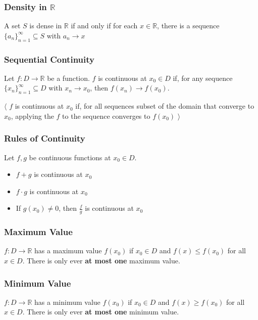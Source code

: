 \documentclass[12pt,letterpaper]{article}
\newcommand{\R}{{\mathbb R}}
\newcommand{\btw}[1]{
    $\langle$ #1 $\rangle$
}
\begin{document}
\begin{multicols*}{2}
        \subsubsection{Density in $\R$}

        A set $S$ is dense in $\R$ if and only if for each $x \in \R$, there is
        a sequence $\{a_n\}_{n = 1}^{\infty} \subseteq S$ with $a_n \rightarrow x$

        \subsubsection{Sequential Continuity}

        Let $f: D \rightarrow \R$ be a function. $f$ is continuous at $x_0 \in
        D$ if, for any sequence $\{x_n\}_{n = 1}^{\infty} \subseteq D$ with $x_n
        \rightarrow x_0$, then $f(x_n) \rightarrow f(x_0)$.

        \btw {
            $f$ is continuous at $x_0$ if, for all sequences subset of the domain
            that converge to $x_0$, applying the $f$ to the sequence converges to
            $f(x_0)$
        }

        \subsubsection{Rules of Continuity}

        Let $f, g$ be continuous functions at $x_0 \in D$.

        \begin{itemize}
            \item $f + g$ is continuous at $x_0$
            \item $f \cdot g$ is continuous at $x_0$
            \item If $g(x_0) \neq 0$, then $\frac{f}{g}$ is continuous at $x_0$
        \end{itemize}

        \subsubsection{Maximum Value}
        $f: D \rightarrow \R$ has a maximum value $f(x_0)$ if $x_0 \in D$ and
        $f(x) \le f(x_0)$ for all $x \in D$. There is only ever {\bf at most
        one} maximum value.

        \subsubsection{Minimum Value}
        $f: D \rightarrow \R$ has a minimum value $f(x_0)$ if $x_0 \in D$ and
        $f(x) \ge f(x_0)$ for all $x \in D$. There is only ever {\bf at most
        one} minimum value.


\end{multicols*}
\end{document}
